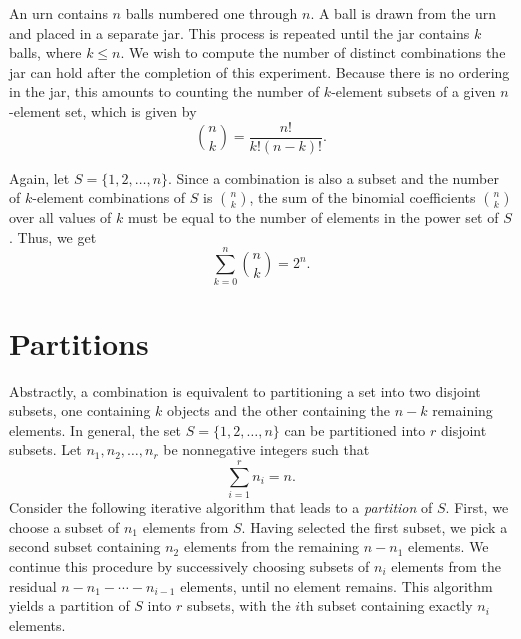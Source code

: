 \begin{example}
An urn contains $n$ balls numbered one through $n$.
A ball is drawn from the urn and placed in a separate jar.
This process is repeated until the jar contains $k$ balls, where $k \leq n$.
We wish to compute the number of distinct combinations the jar can hold after the completion of this experiment.
Because there is no ordering in the jar, this amounts to counting the number of $k$-element subsets of a given $n$-element set, which is given by
\begin{equation*}
\binom{n}{k} = \frac{n!}{k! (n-k)!}.
\end{equation*}
\end{example}

Again, let $S = \{1, 2, \ldots, n\}$.
Since a combination is also a subset and the number of $k$-element combinations of $S$ is $\binom{n}{k}$, the sum of the binomial coefficients $\binom{n}{k}$ over all values of $k$ must be equal to the number of elements in the power set of $S$.
Thus, we get
\begin{equation*}
\sum_{k=0}^n \binom{n}{k} = 2^n .
\end{equation*}


\section{Partitions}

Abstractly, a combination is equivalent to partitioning a set into two disjoint subsets, one containing $k$ objects and the other containing the $n-k$ remaining elements.
In general, the set $S = \{ 1, 2, \ldots, n \}$ can be partitioned into $r$ disjoint subsets.
Let $n_1, n_2, \ldots, n_r$ be nonnegative integers such that
\begin{equation*}
\sum_{i = 1}^r n_i = n.
\end{equation*}
Consider the following iterative algorithm that leads to a \emph{partition} of $S$. 
First, we choose a subset of $n_1$ elements from $S$.
Having selected the first subset, we pick a second subset containing $n_2$ elements from the remaining $n - n_1$ elements.
We continue this procedure by successively choosing subsets of $n_i$ elements from the residual $n - n_1 - \cdots - n_{i-1}$ elements, until no element remains.
This algorithm yields a partition of $S$ into $r$ subsets, with the $i$th subset containing exactly $n_i$ elements.


